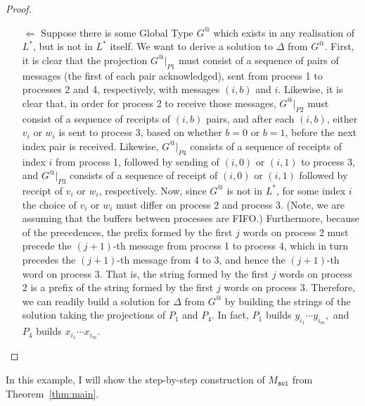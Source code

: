 \begin{proof}
\begin{itemize}
		\item[$\Leftarrow$]
		      Suppose there is some Global Type $G^@$ which
		      exists in any realisation of $L^*$, but is not in $L^*$ itself. We want
		      to derive a solution to $\Delta$ from $G^@$.
		      First, it is clear that the projection $G^@|_{P1}$ must consist of a sequence
		      of pairs of messages (the first of each pair acknowledged), sent from
		      process 1 to processes 2 and 4, respectively, with messages $(i, b)$ and $i$.
		      Likewise, it is clear that, in order for process 2 to receive those messages,
		      $G^@|_{P2}$ must consist of a sequence of receipts of $(i, b)$ pairs, and after
		      each $(i, b)$, either $v_i$ or $w_i$ is sent to process 3, based on whether
		      $b = 0$ or $b = 1$, before the next index pair is received.
		      Likewise, $G^@|_{P4}$ consists of a sequence of receipts of index $i$ from
		      process 1, followed by sending of $(i, 0)$ or $(i, 1)$ to process 3, and
		      $G^@|_{P3}$ consists of a sequence of receipt of $(i, 0)$ or $(i, 1)$ followed
		      by receipt of $v_i$ or $w_i$, respectively.
		      Now, since $G^@$ is not in $L^*$, for some index $i$ the choice of $v_i$ or
		      $w_i$ must differ on process 2 and process 3. (Note, we are assuming that
		      the buffers between processes are FIFO.)
		      Furthermore, because of the precedences, the prefix formed by the first
		      $j$ words on process 2 must precede the $(j + 1)$-th message from
		      process 1 to process 4, which in turn precedes the $(j + 1)$-th message
		      from 4 to 3, and hence the $(j + 1)$-th word on process 3. That is, the
		      string formed by the first $j$ words on process 2 is a prefix of the string
		      formed by the first $j$ words on process 3. Therefore, we can readily
		      build a solution for $\Delta$ from $G^@$ by building the strings of the solution
		      taking the projections of $P_1$ and $P_4$. In fact, $P_1$ builds 
			  $y_{i_1}\cdots y_{i_m},$ and $P_4$ builds $x_{i_1}\cdots x_{i_m}$.

	\end{itemize}

\end{proof}

In this example, I will show the step-by-step construction 
of $M_{\texttt{sol}}$ from Theorem~\ref{thm:main}.

\bigskip

